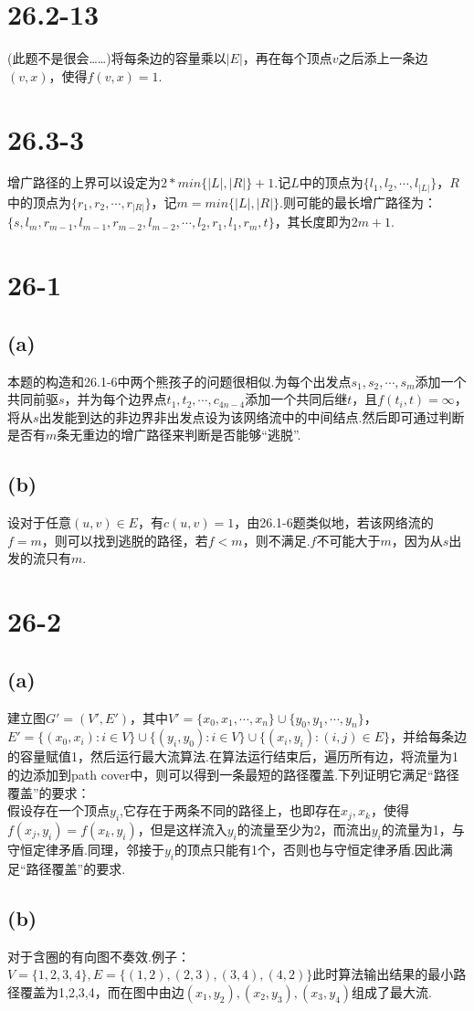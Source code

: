 \documentclass[twocolumn]{article}
\newenvironment{SChinese}{%
	\CJKfamily{gbsn}%
	\CJKtilde
	\CJKnospace}{}
\begin{document}
\begin{CJK}{UTF8}{}
\begin{SChinese}
			\section*{26.2-13}
				(此题不是很会……)将每条边的容量乘以$|E|$，再在每个顶点$v$之后添上一条边$(v,x)$，使得$f(v,x)=1$.
			\section*{26.3-3}
				增广路径的上界可以设定为$2*min\{|L|,|R|\}+1$.记$L$中的顶点为$\{l_1,l_2,\cdots,l_{|L|}\}$，$R$中的顶点为$\{r_1,r_2,\cdots,r_{|R|}\}$，记$m=min\{|L|,|R|\}$.则可能的最长增广路径为：$\{s,l_m,r_{m-1},l_{m-1},r_{m-2},l_{m-2},\cdots,l_2,r_1,l_1,r_m,t\}$，其长度即为$2m+1$.
			\section*{26-1}
				\subsection*{(a)}
					本题的构造和26.1-6中两个熊孩子的问题很相似.为每个出发点$s_1,s_2,\cdots,s_m$添加一个共同前驱$s$，并为每个边界点$t_1,t_2,\cdots,c_{4n-4}$添加一个共同后继$t$，且$f(t_i,t)=\infty$，将从$s$出发能到达的非边界非出发点设为该网络流中的中间结点.然后即可通过判断是否有$m$条无重边的增广路径来判断是否能够“逃脱”.
				\subsection*{(b)}
					设对于任意$(u,v)\in E$，有$c(u,v)=1$，由26.1-6题类似地，若该网络流的$f=m$，则可以找到逃脱的路径，若$f<m$，则不满足.$f$不可能大于$m$，因为从$s$出发的流只有$m$.
			\section*{26-2}
				\subsection*{(a)}
					建立图$G'=(V',E')$，其中$V'=\{x_0,x_1,\cdots,x_n
					\}\cup\{y_0,y_1,\cdots,y_n\}$，$E'=\{(x_0,x_i):i\in V\}\cup\{(y_i,y_0):i\in V\}\cup\{(x_i,y_i):(i,j)\in E\}$，并给每条边的容量赋值1，然后运行最大流算法.在算法运行结束后，遍历所有边，将流量为1的边添加到path cover中，则可以得到一条最短的路径覆盖.下列证明它满足“路径覆盖”的要求：\\
					假设存在一个顶点$y_i$,它存在于两条不同的路径上，也即存在$x_j,x_k$，使得$f(x_j,y_i)=f(x_k,y_i)$，但是这样流入$y_i$的流量至少为2，而流出$y_i$的流量为1，与守恒定律矛盾.同理，邻接于$y_i$的顶点只能有1个，否则也与守恒定律矛盾.因此满足“路径覆盖”的要求.
				\subsection*{(b)}
					对于含圈的有向图不奏效.例子：$V=\{1,2,3,4\},E=\{(1,2),(2,3),(3,4),(4,2)\}$此时算法输出结果的最小路径覆盖为1,2,3,4，而在图中由边$(x_1,y_2),(x_2,y_3),(x_3,y_4)$组成了最大流.
			
		\end{SChinese}
	\end{CJK}
\end{document}
